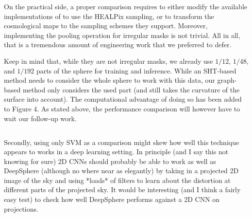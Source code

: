\documentclass[12pt,a4paper]{article}
\newcommand{\nati}[1]{{\color[rgb]{.1,.6,.1}{NP: #1}}}
\newcommand{\mdeff}[1]{{\color[rgb]{.1,.6,.1}{MD: #1}}}
\newcommand{\1}{\b{1}}              %
\newcommand{\0}{\b{0}}              %
\begin{document}
On the practical side, a proper comparison requires to either modify the available implementations of \cite{cohen2018sphericalcnn,esteves2017sphericalcnn,kondor2018clebsch} to use the HEALPix sampling, or to transform the cosmological maps to the sampling schemes they support.
Moreover, implementing the pooling operation for irregular masks is not trivial.
All in all, that is a tremendous amount of engineering work that we preferred to defer.

Keep in mind that, while they are not irregular masks, we already use $1/12$, $1/48$, and $1/192$ parts of the sphere for training and inference.
While an SHT-based method needs to consider the whole sphere to work with this data, our graph-based method only considers the used part (and still takes the curvature of the surface into account).
The computational advantage of doing so has been added to Figure 4.
As stated above, the performance comparison will however have to wait our follow-up work.



\mdeff{measure the computational time of filtering on a 1/12, 1/48 or 1/192 of the sphere with the graph. Add the result to Figure 4 and compare with filtering of the full sphere (with SHT and graph).}

\subsection{}

\begin{mdframed}[style=comment]
Secondly, using only SVM as a comparison might skew how well this technique appears to works in a deep learning setting. In principle (and I say this not knowing for sure) 2D CNNs should probably be able to work as well as DeepSphere (although no where near as elegantly) by taking in a projected 2D image of the sky and using *loads* of filters to learn about the distortion at different parts of the projected sky. It would be interesting (and I think a fairly easy test) to check how well DeepSphere performs against a 2D CNN on projections.
\end{mdframed}
\end{document}
